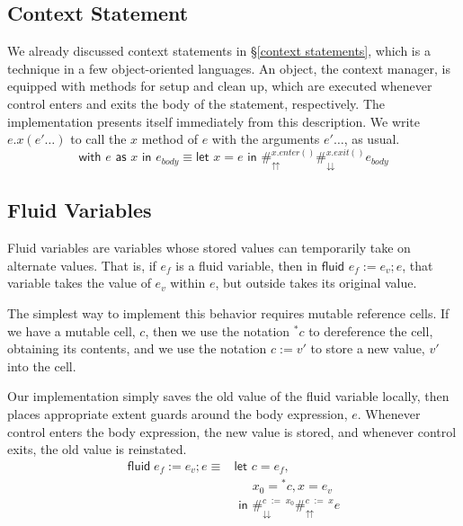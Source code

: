 \documentclass[11pt]{article}
\newcommand{\maybePage}{\newpage}
\newcommand{\letin}[2]{\textsf{let }#1\textsf{ in }#2}
\begin{document}
\maybePage
\subsection{Context Statement}

We already discussed context statements in \S\ref{context statements}, which is a technique in a few object-oriented languages.
An object, the context manager, is equipped with methods for setup and clean up, which are executed whenever control enters and exits the body of the statement, respectively.
The implementation presents itself immediately from this description.
We write $e.x(e'\ldots)$ to call the $x$ method of $e$ with the arguments $e'\ldots$, as usual.
$$\textsf{with }e\textsf{ as }x\textsf{ in }e_{body}
\equiv
	\letin{x = e}{\#_\upuparrows^{x.enter()}\#_\downdownarrows^{x.exit()}e_{body}}$$

%

\maybePage
\subsection{Fluid Variables}

Fluid variables are variables whose stored values can temporarily take on alternate values.
That is, if $e_f$ is a fluid variable, then in $\textsf{fluid }e_f := e_v; e$, that variable takes the value of $e_v$ within $e$, but outside takes its original value.

The simplest way to implement this behavior requires mutable reference cells.
If we have a mutable cell, $c$, then we use the notation $^*c$ to dereference the cell, obtaining its contents, and we use the notation $c := v'$ to store a new value, $v'$ into the cell.

Our implementation simply saves the old value of the fluid variable locally, then places appropriate extent guards around the body expression, $e$.
Whenever control enters the body expression, the new value is stored, and whenever control exits, the old value is reinstated.
\begin{align*}
\textsf{fluid}\;e_f:=e_v;e \equiv{}
	&\letin{c = e_f, \\
	&\quad\;\, x_0 = {}^*c, x = e_v \\
	&}{
	\#_\downdownarrows^{c\;:=\;x_0}\#_\upuparrows^{c\;:=\;x}}e
\end{align*}
\end{document}
